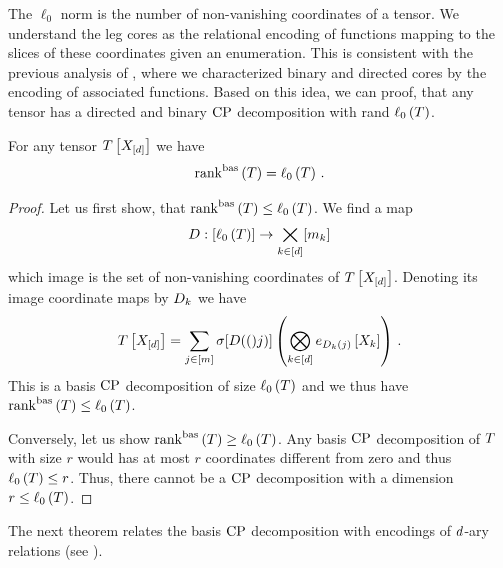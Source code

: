 
The $\ell_0$ norm is the number of non-vanishing coordinates of a tensor.
We understand the leg cores as the relational encoding of functions mapping to the slices of these coordinates given an enumeration.
This is consistent with the previous analysis of , where we characterized binary and directed cores by the encoding of associated functions.
Based on this idea, we can proof, that any tensor has a directed and binary $\mathrm{CP}$ decomposition with rand $\ell_0\left(T\right)$.


\begin{theorem}
    \label{the:sparseBasisCP}
    For any tensor $T\left[X_{[d]}\right]$ we have
    \begin{align*}
        \mathrm{rank}^{\mathrm{bas}}\left(T\right) = \ell_0\left(T\right) \, .
    \end{align*}
\end{theorem}
\begin{proof}
    Let us first show, that $\mathrm{rank}^{\mathrm{bas}}\left(T\right) \leq \ell_0\left(T\right)$.
    We find a map
    \begin{align*}
        D : [\ell_0\left(T\right)] \rightarrow  \bigtimes_{k\in[d]}[m_{k}]
    \end{align*}
    which image is the set of non-vanishing coordinates of $T\left[X_{[d]}\right]$.
    Denoting its image coordinate maps by $D_{k}$ we have
    \begin{align*}
        T\left[X_{[d]}\right]
        = \sum_{j\in[m]} \sigma[D(()j)] \left(\bigotimes_{k\in[d]} e_{D_{k}(j)}\left[X_{k}\right] \right) \, .
    \end{align*}
    This is a basis $\mathrm{CP}$ decomposition of size $\ell_0\left(T\right)$ and we thus have $\mathrm{rank}^{\mathrm{bas}}\left(T\right)\leq\ell_0\left(T\right)$.

    Conversely, let us show $\mathrm{rank}^{\mathrm{bas}}\left(T\right) \geq \ell_0\left(T\right)$.
    Any basis $\mathrm{CP}$ decomposition of $T$ with size $r$ would has at most $r$ coordinates different from zero and thus $\ell_0\left(T\right)\leq r$.
    Thus, there cannot be a $\mathrm{CP}$ decomposition with a dimension $r\leq\ell_0\left(T\right)$.
\end{proof}

%
The next theorem relates the basis $\mathrm{CP}$ decomposition with encodings of $d$-ary relations (see ).

